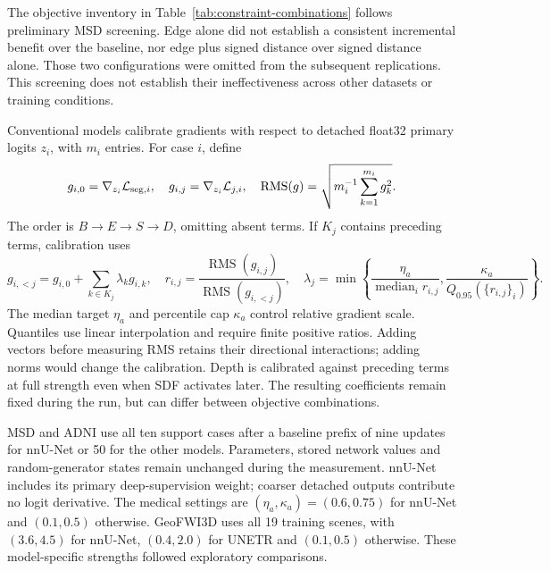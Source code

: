 \documentclass[12pt,a4paper]{article}
\begin{document}
The objective inventory in Table~\ref{tab:constraint-combinations} follows
preliminary MSD screening. Edge alone did not establish a consistent
incremental benefit over the baseline, nor edge plus signed distance
over signed distance alone. Those two configurations were omitted from
the subsequent replications. This screening does not establish their
ineffectiveness across other datasets or training conditions.


Conventional models calibrate gradients with respect to detached
float32 primary logits $z_i$, with $m_i$ entries. For case $i$, define
\begin{equation}
g_{i,0}=\nabla_{z_i}\mathcal L_{{\rm seg},i},\quad
g_{i,j}=\nabla_{z_i}\mathcal L_{j,i},\quad
\operatorname{RMS}(g)=\sqrt{m_i^{-1}\sum_{k=1}^{m_i}g_k^2}.
\label{eq:calibration-logit-gradients}
\end{equation}
The order is $B\to E\to S\to D$, omitting absent terms. If $K_j$
contains preceding terms, calibration uses
\begin{equation}
g_{i,<j}=g_{i,0}+\sum_{k\in K_j}\lambda_k g_{i,k},\quad
r_{i,j}=\frac{\operatorname{RMS}(g_{i,j})}{\operatorname{RMS}(g_{i,<j})},\quad
\lambda_j=\min\left\{\frac{\eta_a}{\operatorname{median}_i r_{i,j}},
\frac{\kappa_a}{Q_{0.95}(\{r_{i,j}\}_i)}\right\}.
\label{eq:constraint-calibrated-coefficient}
\end{equation}
The median target $\eta_a$ and percentile cap $\kappa_a$ control relative
gradient scale. Quantiles use linear interpolation and require finite
positive ratios. Adding vectors before measuring RMS retains their
directional interactions; adding norms would change the calibration.
Depth is calibrated against preceding terms at full strength even when
SDF activates later. The resulting coefficients remain fixed during the
run, but can differ between objective combinations.

MSD and ADNI use all ten support cases after a baseline prefix of nine
updates for nnU-Net or 50 for the other models. Parameters, stored
network values and random-generator states remain unchanged during
the measurement. nnU-Net includes its primary deep-supervision weight;
coarser detached outputs contribute no logit derivative. The medical
settings are $(\eta_a,\kappa_a)=(0.6,0.75)$ for nnU-Net and
$(0.1,0.5)$ otherwise. GeoFWI3D uses all 19 training scenes, with
$(3.6,4.5)$ for nnU-Net, $(0.4,2.0)$ for UNETR and $(0.1,0.5)$
otherwise. These model-specific strengths followed exploratory comparisons.
\end{document}
